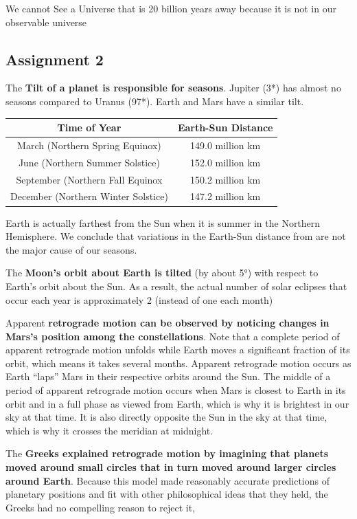 \documentclass[12pt]{article}
\begin{document}
We cannot See a Universe that is 20 billion years away because it is not in our observable universe

\subsection{Assignment 2}
The {\bf Tilt of a planet is responsible for seasons}. Jupiter (3*) has almost no seasons compared to Uranus (97*). Earth and Mars have a similar tilt.


\begin{tabular}{|c|c|}
\hline
Time of Year & Earth-Sun Distance \\ \hline
March (Northern Spring Equinox) & 149.0 million km\\
June (Northern Summer Solstice) & 152.0 million km\\
September (Northern Fall Equinox & 150.2 million km\\
December (Northern Winter Solstice) & 147.2 million km\\ \hline
\end{tabular}

Earth is actually farthest from the Sun when it is summer in the Northern Hemisphere. We conclude that variations in the Earth-Sun distance from are not the major cause of our seasons.

The {\bf Moon’s orbit about Earth is tilted} (by about 5°) with respect to Earth’s orbit about the Sun. As a result, the actual number of solar eclipses that occur each year is approximately 2 (instead of one each month)

Apparent {\bf retrograde motion can be observed by noticing changes in Mars's position among the constellations}. Note that a complete period of apparent retrograde motion unfolds while Earth moves a significant fraction of its orbit, which means it takes several months. Apparent retrograde motion occurs as Earth ``laps'' Mars in their respective orbits around the Sun. The middle of a period of apparent retrograde motion occurs when Mars is closest to Earth in its orbit and in a full phase as viewed from Earth, which is why it is brightest in our sky at that time. It is also directly opposite the Sun in the sky at that time, which is why it crosses the meridian at midnight.

The {\bf Greeks explained retrograde motion by imagining that planets moved around small circles that in turn moved around larger circles around Earth}. Because this model made reasonably accurate predictions of planetary positions and fit with other philosophical ideas that they held, the Greeks had no compelling reason to reject it,
\end{document}
